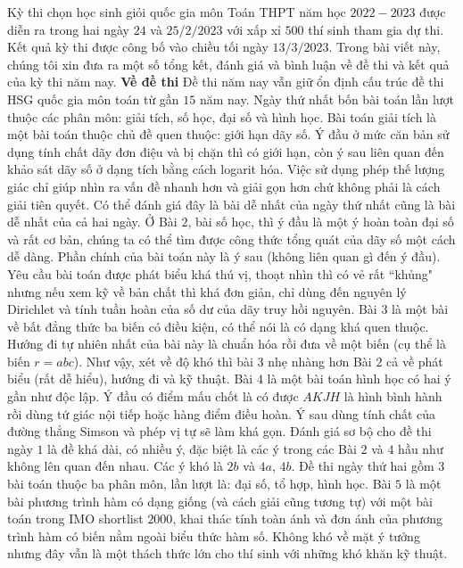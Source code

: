 \begin{multicols}{2}
	Kỳ thi chọn học sinh giỏi quốc gia môn Toán THPT năm học $2022-2023$ được diễn ra trong hai ngày $24$ và $25/2/2023$ với xấp xỉ $500$ thí sinh tham gia dự thi. Kết quả kỳ thi được công bố vào chiều tối ngày $13/3/2023$. Trong bài viết này, chúng tôi xin đưa ra một số tổng kết, đánh giá và bình luận về đề thi và kết quả của kỳ thi năm nay.
	\vskip 0.05cm
	\textbf{\color{cackithi}Về đề thi}
	\vskip 0.05cm
	Đề thi năm nay vẫn giữ ổn định cấu trúc đề thi HSG quốc gia môn toán từ gần $15$ năm nay.
	Ngày thứ nhất bốn bài toán lần lượt thuộc các phân môn: giải tích, số học, đại số và hình học. Bài toán giải tích là một bài toán thuộc chủ đề quen thuộc: giới hạn dãy số. Ý đầu ở mức căn bản sử dụng tính chất dãy đơn điệu và bị chặn thì có giới hạn, còn ý sau liên quan đến khảo sát dãy số ở dạng tích bằng cách logarit hóa. Việc sử dụng phép thế lượng giác chỉ giúp nhìn ra vấn đề nhanh hơn và giải gọn hơn chứ không phải là cách giải tiên quyết. Có thể đánh giá đây là bài dễ nhất của ngày thứ nhất cũng là bài dễ nhất của cả hai ngày. 
	\vskip 0.05cm
	Ở Bài $2$, bài số học, thì ý đầu là một ý hoàn toàn đại số và rất cơ bản, chúng ta có thể tìm được công thức tổng quát của dãy số một cách dễ dàng. Phần chính của bài toán này là ý sau (không liên quan gì đến ý đầu). Yêu cầu bài toán được phát biểu khá thú vị, thoạt nhìn thì có vẻ rất ``khủng" nhưng nếu xem kỹ về bản chất thì khá đơn giản, chỉ dùng đến nguyên lý Dirichlet và tính tuần hoàn của số dư của dãy truy hồi nguyên. 
	\vskip 0.05cm
	Bài $3$ là một bài về bất đẳng thức ba biến có điều kiện, có thể nói là có dạng khá quen thuộc. Hướng đi tự nhiên nhất của bài này là chuẩn hóa rồi đưa về một biến (cụ thể là biến $r = abc$). Như vậy, xét về độ khó thì bài $3$ nhẹ nhàng hơn Bài $2$ cả về phát biểu (rất dễ hiểu), hướng đi và kỹ thuật.  
	\vskip 0.05cm
	Bài $4$ là một bài toán hình học có hai ý gần như độc lập. Ý đầu có điểm mấu chốt là có được $AKJH$ là hình bình hành rồi dùng tứ giác nội tiếp hoặc hàng điểm điều hoàn. Ý sau dùng tính chất của đường thẳng Simson và phép vị tự sẽ làm khá gọn. 
	\vskip 0.05cm
	Đánh giá sơ bộ cho đề thi ngày $1$ là đề khá dài, có nhiều ý, đặc biệt là các ý trong các Bài $2$ và $4$ hầu như không lên quan đến nhau. Các ý khó là $2b$ và $4a$, $4b$.
	\vskip 0.05cm 
	Đề thi ngày thứ hai gồm $3$ bài toán thuộc ba phân môn, lần lượt là: đại số, tổ hợp, hình học.
	\vskip 0.05cm
	Bài $5$ là một bài phương trình hàm có dạng giống (và cách giải cũng tương tự) với một bài toán trong IMO shortlist $2000$, khai thác tính toàn ánh và đơn ánh của phương trình hàm có biến nằm ngoài biểu thức hàm số. Không khó về mặt ý tưởng nhưng đây vẫn là một thách thức lớn cho thí sinh với những khó khăn kỹ thuật.   

\end{multicols}
